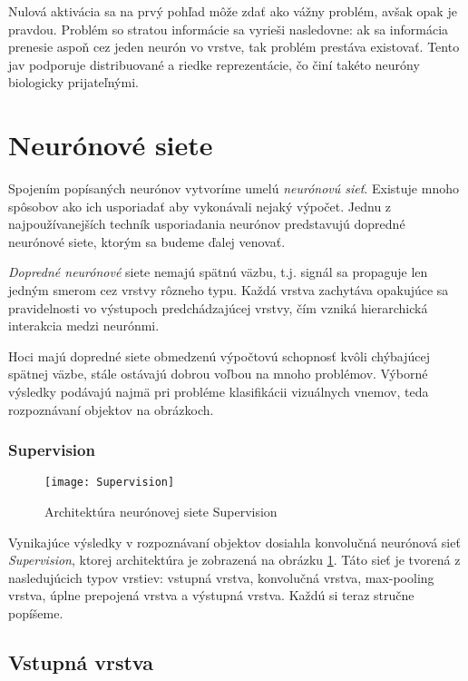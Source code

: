 Nulová aktivácia sa na prvý pohľad môže zdať ako vážny problém, avšak opak je pravdou. Problém so stratou informácie sa vyrieši nasledovne: ak sa informácia prenesie aspoň cez jeden neurón vo vrstve, tak problém prestáva existovať. Tento jav  podporuje distribuované a riedke reprezentácie, čo činí takéto neuróny biologicky prijateľnými. \autocite{Glorot2011}

\section{Neurónové siete}

Spojením popísaných neurónov vytvoríme umelú \emph{neurónovú sieť}. Existuje mnoho spôsobov ako ich usporiadať aby vykonávali nejaký výpočet. Jednu z najpoužívanejších techník usporiadania neurónov predstavujú dopredné neurónové siete, ktorým sa budeme ďalej venovať.

\emph{Dopredné neurónové} siete nemajú spätnú väzbu, t.j. signál sa propaguje len jedným smerom cez vrstvy rôzneho typu. Každá vrstva zachytáva opakujúce sa pravidelnosti vo výstupoch predchádzajúcej vrstvy, čím vzniká hierarchická interakcia medzi neurónmi.

Hoci majú dopredné siete obmedzenú výpočtovú schopnosť kvôli chýbajúcej spätnej väzbe, stále ostávajú dobrou voľbou na mnoho problémov. Výborné výsledky podávajú najmä pri probléme klasifikácii vizuálnych vnemov, teda rozpoznávaní objektov na obrázkoch.

\subsubsection{Supervision}

\begin{figure}
  \centering
  \texttt{[image: Supervision]}
  \caption{Architektúra neurónovej siete Supervision}
  \label{fig:Supervision}
\end{figure}

Vynikajúce výsledky v rozpoznávaní objektov dosiahla konvolučná neurónová sieť \emph{Supervision}\autocite{Krizhevsky2012}, ktorej architektúra je zobrazená na obrázku \ref{fig:Supervision}. Táto sieť je tvorená z nasledujúcich typov vrstiev: vstupná vrstva, konvolučná vrstva, max-pooling vrstva, úplne prepojená vrstva a výstupná vrstva. Každú si teraz stručne popíšeme.

\subsection{Vstupná vrstva}

